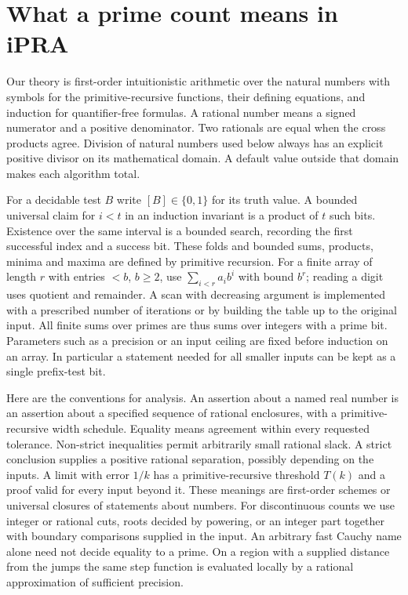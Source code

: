 \section{What a prime count means in iPRA}
\label{sec:found}
Our theory is first-order intuitionistic arithmetic over the natural numbers with symbols for the primitive-recursive functions, their defining equations, and induction for quantifier-free formulas. A rational number means a signed numerator and a positive denominator. Two rationals are equal when the cross products agree. Division of natural numbers used below always has an explicit positive divisor on its mathematical domain. A default value outside that domain makes each algorithm total.

For a decidable test $B$ write $[B]\in\{0,1\}$ for its truth value. A bounded universal claim for $i<t$ in an induction invariant is a product of $t$ such bits. Existence over the same interval is a bounded search, recording the first successful index and a success bit. These folds and bounded sums, products, minima and maxima are defined by primitive recursion. For a finite array of length $r$ with entries $<b$, $b\ge2$, use $\sum_{i<r}a_i b^i$ with bound $b^r$; reading a digit uses quotient and remainder. A scan with decreasing argument is implemented with a prescribed number of iterations or by building the table up to the original input. All finite sums over primes are thus sums over integers with a prime bit. Parameters such as a precision or an input ceiling are fixed before induction on an array. In particular a statement needed for all smaller inputs can be kept as a single prefix-test bit.

Here are the conventions for analysis. An assertion about a named real number is an assertion about a specified sequence of rational enclosures, with a primitive-recursive width schedule. Equality means agreement within every requested tolerance. Non-strict inequalities permit arbitrarily small rational slack. A strict conclusion supplies a positive rational separation, possibly depending on the inputs. A limit with error $1/k$ has a primitive-recursive threshold $T(k)$ and a proof valid for every input beyond it. These meanings are first-order schemes or universal closures of statements about numbers. For discontinuous counts we use integer or rational cuts, roots decided by powering, or an integer part together with boundary comparisons supplied in the input. An arbitrary fast Cauchy name alone need not decide equality to a prime. On a region with a supplied distance from the jumps the same step function is evaluated locally by a rational approximation of sufficient precision.

